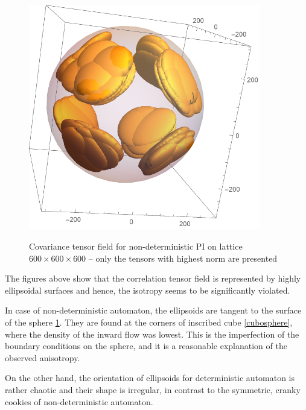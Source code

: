 \begin{figure}[H] 
 \centering  \label{noncor}
 \includegraphics[width=0.9\textwidth]{./img/noncor}
 \caption{Covariance tensor field for non-deterministic PI on lattice $600\times 600\times 600$ -- only the tensors with highest norm are presented}
\end{figure}



The figures above show that the correlation tensor field is represented by highly ellipsoidal surfaces and hence, the isotropy seems to be significantly violated. 

In case of non-deterministic automaton, the ellipsoids are tangent to the surface of the sphere \ref{noncor}. They are found at the corners of inscribed cube \ref{cubosphere}, where the density of the inward flow was lowest. This is the imperfection of the boundary conditions on the sphere, and it is a reasonable explanation of the observed anisotropy.

On the other hand, the orientation of ellipsoids for deterministic automaton is rather chaotic and their shape is irregular, in contrast to the symmetric, cranky cookies of non-deterministic automaton.

